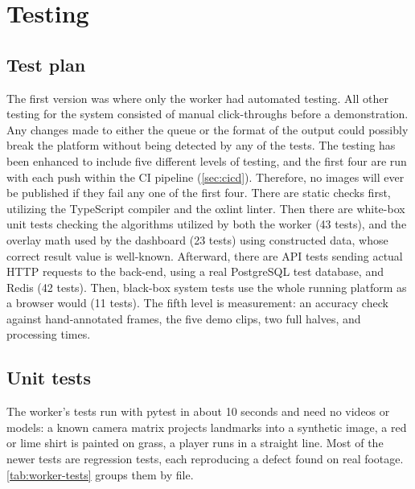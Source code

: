 \chapter{Testing}
\label{ch:testing}

\section{Test plan}

The first version was where only the worker had automated testing. All other testing for the system consisted of manual click-throughs before a demonstration. Any changes made to either the queue or the format of the output could possibly break the platform without being detected by any of the tests. The testing has been enhanced to include five different levels of testing, and the first four are run with each push within the CI pipeline (\autoref{sec:cicd}). Therefore, no images will ever be published if they fail any one of the first four. There are static checks first, utilizing the TypeScript compiler and the oxlint linter. Then there are white-box unit tests checking the algorithms utilized by both the worker (43 tests), and the overlay math used by the dashboard (23 tests) using constructed data, whose correct result value is well-known. Afterward, there are API tests sending actual HTTP requests to the back-end, using a real PostgreSQL test database, and Redis (42 tests). Then, black-box system tests use the whole running platform as a browser would (11 tests). The fifth level is measurement: an accuracy check against hand-annotated frames, the five demo clips, two full halves, and processing times.

\section{Unit tests}

The worker's tests run with pytest in about 10 seconds and need no videos or models: a known camera matrix projects landmarks into a synthetic image, a red or lime shirt is painted on grass, a player runs in a straight line. Most of the newer tests are regression tests, each reproducing a defect found on real footage. \autoref{tab:worker-tests} groups them by file.


